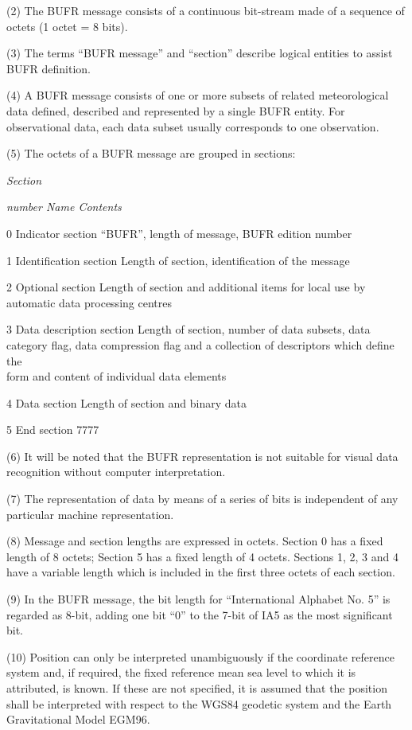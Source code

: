 (2) The BUFR message consists of a continuous bit-stream made of a sequence of octets (1 octet = 8 bits).

(3) The terms ``BUFR message'' and ``section'' describe logical entities to assist BUFR definition.

(4) A BUFR message consists of one or more subsets of related meteorological data defined, described and represented by a single BUFR entity. For observational data, each data subset usually corresponds to one observation.

(5) The octets of a BUFR message are grouped in sections:

\emph{Section}

\emph{number Name Contents}

0 Indicator section ``BUFR'', length of message, BUFR edition number

1 Identification section Length of section, identification of the message

2 Optional section Length of section and additional items for local use by automatic data processing centres

3 Data description section Length of section, number of data subsets, data category flag, data compression flag and a collection of descriptors which define the\\
form and content of individual data elements

4 Data section Length of section and binary data

5 End section 7777

(6) It will be noted that the BUFR representation is not suitable for visual data recognition without computer interpretation.

(7) The representation of data by means of a series of bits is independent of any particular machine representation.

(8) Message and section lengths are expressed in octets. Section 0 has a fixed length of 8 octets; Section 5 has a fixed length of 4 octets. Sections 1, 2, 3 and 4 have a variable length which is included in the first three octets of each section.

(9) In the BUFR message, the bit length for ``International Alphabet No. 5'' is regarded as 8-bit, adding one bit ``0'' to the 7-bit of IA5 as the most significant bit.\textbf{\\
}

(10) Position can only be interpreted unambiguously if the coordinate reference system and, if required, the fixed reference mean sea level to which it is attributed, is known. If these are not specified, it is assumed that the position shall be interpreted with respect to the WGS84 geodetic system and the Earth Gravitational Model EGM96.

